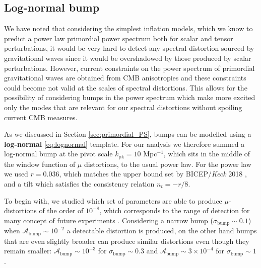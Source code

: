 \subsection{Log-normal bump}
We have noted that considering the simplest inflation models, which we know to predict a power law primordial power spectrum both for scalar and tensor perturbations, it would  be very hard to detect any spectral distortion sourced by gravitational waves since it would be overshadowed by those produced by scalar perturbations. However, current constraints on the power spectrum of primordial gravitational waves are obtained from CMB anisotropies and these constraints could become not valid at the scales of spectral distortions. This allows for the possibility of considering bumps in the power spectrum which make more excited only the modes that are relevant for our spectral distortions without spoiling current CMB measures.

As we discussed in Section \ref{sec:primordial_PS}, bumps can be modelled using a \textbf{log-normal} \eqref{eq:lognormal} template. For our analysis we therefore summed a log-normal bump at the pivot scale $k_\text{pk}=10$ Mpc$^{-1}$, which sits in the middle of the window function of $\mu$ distortions, to the usual power law. For the power law we used $r=0.036$, which matches the upper bound set by BICEP/\textit{Keck} 2018 \cite{Ade_2021}, and a tilt which satisfies the consistency relation $n_t=-r/8$. 

To begin with, we studied which set of parameters are able to produce $\mu$-distortions of the order of $10^{-8}$, which corresponds to the range of detection for many concept of future experiments \cite{Chluba_2021}. Considering a narrow bump ($\sigma_\text{bump}\sim0.1$) when $\mathcal{A}_\text{bump}\sim 10^{-2}$ a detectable distortion is produced, on the other hand bumps that are even slightly broader can produce similar distortions even though they remain smaller: $\mathcal{A}_\text{bump}\sim 10^{-3}$ for $\sigma_\text{bump}\sim0.3$ and $\mathcal{A}_\text{bump}\sim 3\times10^{-4}$ for $\sigma_\text{bump}\sim1$. 

